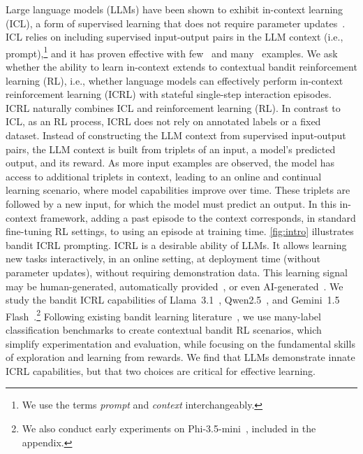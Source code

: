 \documentclass{article}
\theoremstyle{plain}
\theoremstyle{definition}
\theoremstyle{remark}
\newcommand{\llama}{Llama\xspace}
\newcommand{\phillm}{Phi\xspace}
\newcommand{\qwen}{Qwen\xspace}
\newcommand{\gemini}{Gemini\xspace}
\begin{document}
Large language models (LLMs) have been shown to exhibit in-context learning (ICL), a form of supervised learning that does not require parameter updates~\citep{brown2020language}.
ICL relies on including supervised input-output pairs in the LLM context (i.e., prompt),\footnote{We use the terms \emph{prompt} and \emph{context} interchangeably.} and it has proven effective with few~\citep{brown2020language} and many~\citep{bertsch2024incontext, agarwal2024manyshotincontextlearning} examples.
We ask whether the ability to learn in-context extends to contextual bandit reinforcement learning (RL), i.e., whether language models can effectively perform in-context reinforcement learning (ICRL) with stateful single-step interaction episodes.
ICRL naturally combines ICL and reinforcement learning (RL).
In contrast to ICL, as an RL process, ICRL does not rely on annotated labels or a fixed dataset. Instead of constructing the LLM context from supervised input-output pairs, the LLM context is built from triplets of an input, a model's predicted output, and its reward. As more input examples are observed, the model has access to additional triplets in context, leading to an online and continual learning scenario, where model capabilities improve over time. These triplets are followed by a new input, for which the model must predict an output. In this in-context framework, adding a past episode to the context corresponds, in standard fine-tuning RL settings, to using an episode at training time. \autoref{fig:intro} illustrates bandit ICRL prompting.
ICRL is a desirable ability of LLMs. It allows learning new tasks interactively, in an online setting, at deployment time (without parameter updates), without requiring demonstration data. This learning signal may be human-generated, automatically provided~\citep[i.e., a program successfully completes; ][]{gehring2024rlefgroundingcodellms}, or even AI-generated~\citep{zhang2024generative}.
We study the bandit ICRL capabilities of \llama{}~3.1~\citep{dubey2024llama}, \qwen{}{2.5}~\citep{qwen2024qwen25}, and \gemini~1.5 Flash~\citep{geminiteam2024geminifamilyhighlycapable}.\footnote{We also conduct early experiments on  \phillm{}-3.5-mini~\citep{abdin2024phi3technicalreporthighly}, included in the appendix.}
Following existing bandit learning literature~\citep{pmlr-v97-zhang19b, bietti2021contextual}, we use many-label classification benchmarks to create contextual bandit RL scenarios, which simplify experimentation and evaluation, while focusing on the fundamental skills of exploration and learning from rewards.
We find that LLMs demonstrate innate ICRL capabilities, but that two choices are critical for effective learning.
\end{document}
